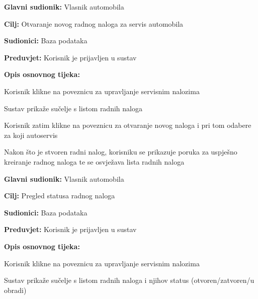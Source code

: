 \noindent {}
\begin{packed_item}
	
	\item \textbf{Glavni sudionik: } Vlasnik automobila
	\item  \textbf{Cilj:} Otvaranje novog radnog naloga za servis automobila
	\item  \textbf{Sudionici:} Baza podataka
	\item  \textbf{Preduvjet:} Korisnik je prijavljen u sustav
	\item  \textbf{Opis osnovnog tijeka:}
	
	\item[] \begin{packed_enum}
		
		\item Korisnik klikne na poveznicu za upravljanje servisnim nalozima
		\item Sustav prikaže sučelje s listom radnih naloga
		\item Korisnik zatim klikne na poveznicu za otvaranje novog naloga i pri
		tom odabere za koji autoservis
		\item Nakon što je stvoren radni nalog, korisniku se prikazuje poruka za
		uspješno kreiranje radnog naloga te se osvježava lista radnih naloga
		
	\end{packed_enum}
\end{packed_item}

\noindent {}
\begin{packed_item}
	
	\item \textbf{Glavni sudionik: } Vlasnik automobila
	\item  \textbf{Cilj:} Pregled statusa radnog naloga
	\item  \textbf{Sudionici:} Baza podataka
	\item  \textbf{Preduvjet:} Korisnik je prijavljen u sustav
	\item  \textbf{Opis osnovnog tijeka:}
	
	\item[] \begin{packed_enum}
		
		\item Korisnik klikne na poveznicu za upravljanje servisnim nalozima
		\item Sustav prikaže sučelje s listom radnih naloga i njihov status
		(otvoren/zatvoren/u obradi)
		
	\end{packed_enum}
\end{packed_item}

